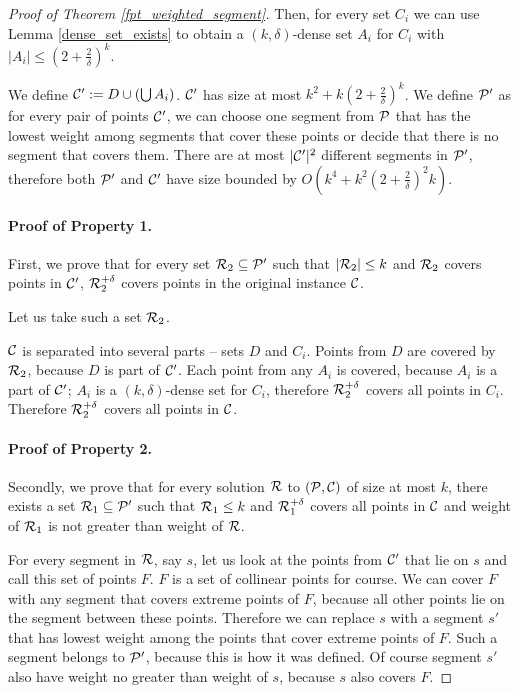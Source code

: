 \begin{proof}[Proof of Theorem \ref{fpt_weighted_segment}]
Then, for every set $C_i$ we can use Lemma \ref{dense_set_exists}
to obtain a $(k,\delta)$-dense set $A_i$
for $C_i$ with $|A_i| \le (2+\frac{2}{\delta})^k$.

We define $\mathcal{C}':= D \cup (\bigcup A_i)$. $\mathcal{C}'$ has size at most
$k^2 + k(2+\frac{2}{\delta})^k$.
We define $\mathcal{P}'$ as
for every pair of points $\mathcal{C}'$, we can choose one segment from
$\mathcal{P}$ that has the lowest weight
among segments that cover these points 
or decide that there is no segment that covers them.
There are at most $|\mathcal{C}'|^2$ different segments in $\mathcal{P}'$,
therefore both $\mathcal{P}'$ and $\mathcal{C}'$ have size bounded
by $O(k^4 + k^2(2+\frac{2}{\delta})^2k)$.

\paragraph{Proof of Property 1.}
First, we prove that
for every set $\mathcal{R}_2 \subseteq \mathcal{P}'$ such that $|\mathcal{R}_2| \le k$
and $\mathcal{R}_2$ covers points in $\mathcal{C}'$, $\mathcal{R}_2^{+\delta}$
covers points in the original instance $\mathcal{C}$.

Let us take such a set $\mathcal{R}_2$.

$\mathcal{C}$ is separated into several parts -- sets $D$ and $C_i$.
Points from $D$ are covered by $\mathcal{R}_2$, because $D$ is part of $\mathcal{C}'$.
Each point from any $A_i$ is covered, because $A_i$ is a part of $\mathcal{C}'$;
$A_i$ is a $(k,\delta)$-dense set for $C_i$, therefore $\mathcal{R}_2^{+\delta}$
covers all points in $C_i$. Therefore $\mathcal{R}_2^{+\delta}$ covers
all points in $\mathcal{C}$.

\paragraph{Proof of Property 2.}
Secondly, we prove that for every solution
$\mathcal{R}$ to $(\mathcal{P}, \mathcal{C})$ of size at most $k$,
there exists a set $\mathcal{R}_1 \subseteq \mathcal{P}'$ such that
$\mathcal{R}_1 \le k$ and
$\mathcal{R}_1^{+\delta}$ covers all points in $\mathcal{C}$ and
weight of $\mathcal{R}_1$ is not greater than weight of $\mathcal{R}$.

For every segment in $\mathcal{R}$, say $s$,
let us look at the points from $\mathcal{C}'$ that lie on $s$
and call this set of points $F$.
$F$ is a set of collinear points for course.
We can cover $F$ with any segment that covers extreme points of $F$,
because all other points lie on the segment between these points.
Therefore we can replace $s$ with a segment $s'$
that has lowest weight among the points that cover extreme points of $F$.
Such a segment belongs to $\mathcal{P}'$, because this is how it was defined.
Of course segment $s'$ also have weight no greater than weight of $s$,
because $s$ also covers $F$.


\end{proof}

